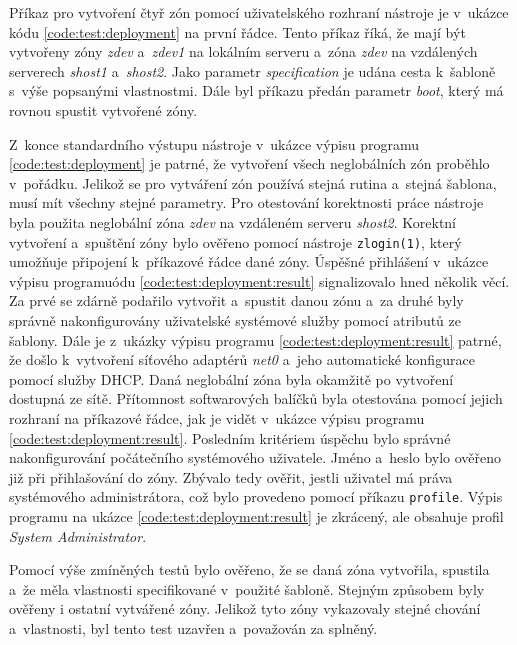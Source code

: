 Příkaz pro vytvoření čtyř zón pomocí uživatelského rozhraní nástroje je v~ukázce kódu \ref{code:test:deployment} na první řádce.
Tento příkaz říká, že mají být vytvořeny zóny \textit{zdev} a~\textit{zdev1} na lokálním serveru a~zóna \textit{zdev} na vzdálených
serverech \textit{shost1} a~\textit{shost2}. Jako parametr \textit{specification} je udána cesta k~šabloně s~výše popsanými 
vlastnostmi. Dále byl příkazu předán parametr \textit{boot}, který má rovnou spustit vytvořené zóny.


Z~konce standardního výstupu nástroje v~ukázce výpisu programu \ref{code:test:deployment} je patrné, že vytvoření všech neglobálních zón
proběhlo v~pořádku. Jelikož se pro vytváření zón používá stejná rutina a~stejná šablona, musí mít všechny stejné parametry.
Pro otestování korektnosti práce nástroje byla použita neglobální zóna \textit{zdev} na vzdáleném serveru \textit{shost2}.
Korektní vytvoření a~spuštění zóny bylo ověřeno pomocí nástroje \verb|zlogin(1)|, který umožňuje připojení k~příkazové řádce dané
zóny. Úspěšné přihlášení v~ukázce výpisu programuódu \ref{code:test:deployment:result} signalizovalo hned několik věcí. Za prvé se zdárně
podařilo vytvořit a~spustit danou zónu a~za druhé byly správně nakonfigurovány uživatelské systémové služby pomocí atributů ze šablony.
Dále je z~ukázky výpisu programu \ref{code:test:deployment:result} patrné, že došlo k~vytvoření síťového adaptérů \textit{net0} a~jeho automatické
konfigurace pomocí služby DHCP. Daná neglobální zóna byla okamžitě po vytvoření dostupná ze sítě. Přítomnost softwarových
balíčků byla otestována pomocí jejich rozhraní na příkazové řádce, jak je vidět v~ukázce výpisu programu \ref{code:test:deployment:result}.
Posledním kritériem úspěchu bylo správné nakonfigurování počátečního systémového uživatele. Jméno a~heslo bylo ověřeno již
při přihlašování do zóny. Zbývalo tedy ověřit, jestli uživatel má práva systémového administrátora, což bylo provedeno pomocí
příkazu \verb|profile|. Výpis programu na ukázce \ref{code:test:deployment:result} je zkrácený, ale obsahuje profil \textit{System Administrator}.

Pomocí výše zmíněných testů bylo ověřeno, že se daná zóna vytvořila, spustila a~že měla vlastnosti specifikované v~použité šabloně.
Stejným způsobem byly ověřeny i ostatní vytvářené zóny. Jelikož tyto zóny vykazovaly stejné chování a~vlastnosti, byl tento
test uzavřen a~považován za splněný.
